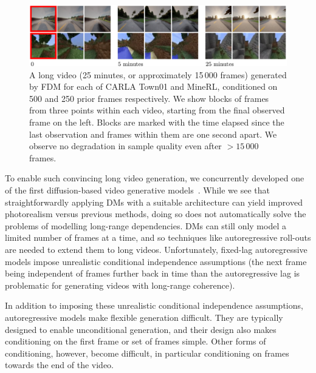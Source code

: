 \begin{figure}[t]
    \centering
    \includegraphics[width=\textwidth]{figs/fdm/fig1.pdf}
    \caption{A long video (25 minutes, or approximately 15\,000 frames) generated by FDM for each of CARLA Town01 and MineRL, conditioned on 500 and 250 prior frames respectively. We show blocks of frames from three points within each video, starting from the final observed frame on the left. Blocks are marked with the time elapsed since the last observation and frames within them are one second apart. We observe no degradation in sample quality even after $>15\,000$ frames.}
    \label{fig:fdm-1}
\end{figure}

To enable such convincing long video generation, 
we concurrently developed one of the first diffusion-based video generative models~\cite{ho2022video,yang2022diffusion,voleti2022mcvd}. While we see that straightforwardly applying DMs with a suitable architecture can yield improved photorealism versus previous methods, doing so does not automatically solve the problems of modelling long-range dependencies. DMs can still only model a limited number of frames at a time, and so techniques like autoregressive roll-outs are needed to extend them to long videos. Unfortunately, fixed-lag autoregressive models impose unrealistic conditional independence assumptions (the next frame being independent of frames further back in time than the autoregressive lag is problematic for generating videos with long-range coherence).  

In addition to imposing these unrealistic conditional independence assumptions, autoregressive models make flexible generation difficult. They are typically designed to enable unconditional generation, and their design also makes conditioning on the first frame or set of frames simple. Other forms of conditioning, however, become difficult, in particular conditioning on frames towards the end of the video.

